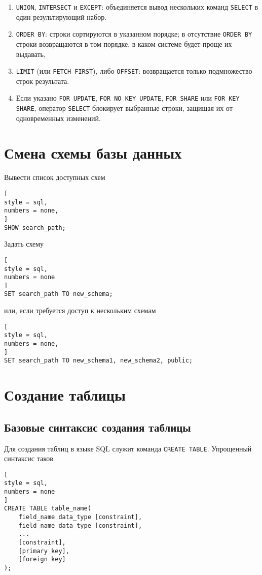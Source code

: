 \documentclass[%
	11pt,
	a4paper,
	utf8,
		]{article}
\begin{document}
\begin{enumerate}
	\item \texttt{UNION}, \texttt{INTERSECT} и \texttt{EXCEPT}: объединяется вывод нескольких команд \texttt{SELECT} в один результирующий набор.
	
	\item \texttt{ORDER BY}: строки сортируются в указанном порядке; в отсутствие \texttt{ORDER BY} строки возвращаются в том порядке, в каком системе будет проще их выдавать,
	
	\item \texttt{LIMIT} (или \texttt{FETCH FIRST}), либо \texttt{OFFSET}: возвращается только подмножество строк результата.
	
	\item Если указано \texttt{FOR UPDATE}, \texttt{FOR NO KEY UPDATE}, \texttt{FOR SHARE} или \texttt{FOR KEY SHARE}, оператор \texttt{SELECT} блокирует выбранные строки, защищая их от одновременных изменений.
\end{enumerate}

\section{Смена схемы базы данных}

Вывести список доступных схем

\begin{lstlisting}[
style = sql,
numbers = none,
]
SHOW search_path;
\end{lstlisting}

Задать схему 

\begin{lstlisting}[
style = sql,
numbers = none
]
SET search_path TO new_schema;
\end{lstlisting}
или, если требуется доступ к нескольким схемам
\begin{lstlisting}[
style = sql,
numbers = none,
]
SET search_path TO new_schema1, new_schema2, public;
\end{lstlisting}

\section{Создание таблицы}

\subsection{Базовые синтаксис создания таблицы}

Для создания таблиц в языке SQL служит команда \texttt{CREATE TABLE}. Упрощенный синтаксис таков
\begin{lstlisting}[
style = sql,
numbers = none
]
CREATE TABLE table_name(
    field_name data_type [constraint],
    field_name data_type [constraint],
    ...
    [constraint],
    [primary key],
    [foreign key]
);
\end{lstlisting}
\end{document}
